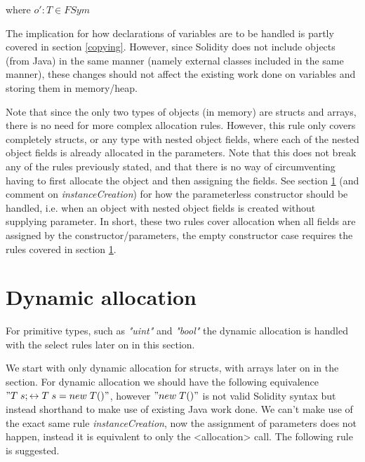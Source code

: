 \documentclass{article}
\begin{document}
	\begin{prooftree}
	\end{prooftree}
	
	where $o' : T \in FSym$
	
	The implication for how declarations of variables are to be handled is partly covered in section \ref{copying}. However, since Solidity does not include objects (from Java) in the same manner (namely external classes included in the same manner), these changes should not affect the existing work done on variables and storing them in memory/heap. 
	
	Note that since the only two types of objects (in memory) are structs and arrays, there is no need for more complex allocation rules. However, this rule only covers completely structs, or any type with nested object fields, where each of the nested object fields is already allocated in the parameters. Note that this does not break any of the rules previously stated, and that there is no way of circumventing having to first allocate the object and then assigning the fields. See section \ref{dynamic} (and comment on \textit{instanceCreation}) for how the parameterless constructor should be handled, i.e. when an object with nested object fields is created without supplying parameter. In short, these two rules cover allocation when all fields are assigned by the constructor/parameters, the empty constructor case requires the rules covered in section \ref{dynamic}. 
	
	\section{Dynamic allocation} \label{dynamic}
	For primitive types, such as \textit{"uint"} and \textit{"bool"} the dynamic allocation is handled with the select rules later on in this section. 
	
	We start with only dynamic allocation for structs, with arrays later on in the section. For dynamic allocation we should have the following equivalence $"T\; s; \leftrightarrow T\;  s = new\;  T()"$, however $"new\;  T()"$ is not valid Solidity syntax but instead shorthand to make use of existing Java work done. We can't make use of the exact same rule \textit{instanceCreation}, now the assignment of parameters does not happen, instead it is equivalent to only the <allocation> call. The following rule is suggested. 
	
\end{document}
